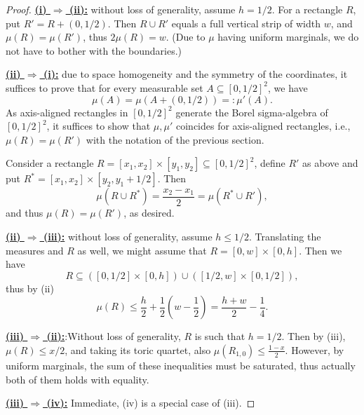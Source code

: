 \documentclass{article}
\theoremstyle{definition}
\begin{document}
\begin{proof}
    \underline{\bf (i) $\Rightarrow$ (ii):} without loss of generality, assume $h=1/2$. For a rectangle $R$, put $R'=R+(0, 1/2).$ Then $R\cup R'$ equals a full vertical strip of width $w$, and $\mu(R)=\mu(R')$, thus $2\mu(R)=w$. (Due to $\mu$ having uniform marginals, we do not have to bother with the boundaries.)

    \underline{\bf (ii) $\Rightarrow$ (i):} due to space homogeneity and the symmetry of the coordinates, it suffices to prove that for every measurable set $A\subseteq[0, 1/2]^2$, we have
    $$\mu(A)=\mu(A+(0, 1/2))=:\mu'(A).$$
    As axis-aligned rectangles in $[0, 1/2]^2$ generate the Borel sigma-algebra of $[0, 1/2]^2$, it suffices to show that $\mu, \mu'$ coincides for axis-aligned rectangles, i.e., $\mu(R)=\mu(R')$ with the notation of the previous section.
    
    Consider a rectangle $R=[x_1, x_2]\times [y_1, y_2]\subseteq [0,1/2]^2$, define $R'$ as above and put $R^*=[x_1, x_2]\times [y_2, y_1+1/2]$. Then
    $$\mu(R\cup R^*)=\frac{x_2-x_1}{2}=\mu(R^*\cup R'),$$
    and thus $\mu(R)=\mu(R')$, as desired.

    \underline{\bf (ii) $\Rightarrow$ (iii):} without loss of generality, assume $h\leq 1/2$. Translating the measures and $R$ as well, we might assume that $R=[0, w]\times [0, h]$. Then we have
    $$R\subseteq \left([0, 1/2]\times [0, h]\right)\cup\left([1/2, w]\times [0, 1/2]\right),$$
    thus by (ii)
    \begin{equation}\label{eq:mu_of_R}
    \mu(R)\leq \frac{h}{2}+\frac{1}{2}\left(w-\frac{1}{2}\right)=\frac{h+w}{2}-\frac{1}{4}.
    \end{equation}

    \underline{\bf (iii) $\Rightarrow$ (ii):}:Without loss of generality, $R$ is such that $h=1/2$. Then by (iii), $\mu(R)\leq x/2$, and taking its toric quartet, also $\mu(R_{1, 0})\leq \frac{1-x}{2}$. However, by uniform marginals, the sum of these inequalities must be saturated, thus actually both of them holds with equality.

    \underline{\bf (iii) $\Rightarrow$ (iv):} Immediate, (iv) is a special case of (iii).


\end{proof}
\end{document}
